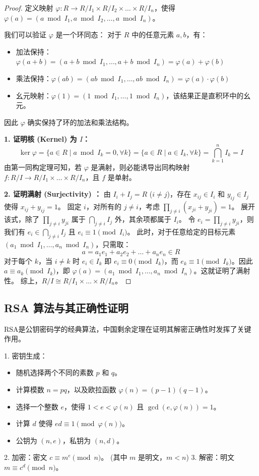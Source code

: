 \documentclass[11pt]{article}
\begin{document}
\begin{proof}
定义映射 $\varphi: R \to R/I_1 \times R/I_2 \times \dots \times R/I_n$，使得 $\varphi(a) = (a \bmod I_1, a \bmod I_2, \dots, a \bmod I_n)$。

我们可以验证 $\varphi$ 是一个环同态：
对于 $R$ 中的任意元素 $a, b$，有：
\begin{itemize}
    \item 加法保持：$\varphi(a+b) = (a+b \bmod I_1, \dots, a+b \bmod I_n) = \varphi(a) + \varphi(b)$
    \item 乘法保持：$\varphi(ab) = (ab \bmod I_1, \dots, ab \bmod I_n) = \varphi(a) \cdot \varphi(b)$
    \item 幺元映射：$\varphi(1) = (1 \bmod I_1, \dots, 1 \bmod I_n)$，该结果正是直积环中的幺元。
\end{itemize}
因此 $\varphi$ 确实保持了环的加法和乘法结构。

\textbf{1. 证明核 (Kernel) 为 $I$：}
$$ \ker \varphi = \{ a \in R \mid a \bmod I_k = 0, \forall k \} = \{ a \in R \mid a \in I_k, \forall k \} = \bigcap_{k=1}^n I_k = I $$
由第一同构定理可知，若 $\varphi$ 是满射，则必能诱导出同构映射 $f: R/I \to R/I_1 \times \dots \times R/I_n$，且 $f$ 是单射。

\textbf{2. 证明满射 (Surjectivity) ：}
由 $I_i + I_j = R$ ($i \neq j$)，存在 $x_{ij} \in I_i$ 和 $y_{ij} \in I_j$ 使得 $x_{ij} + y_{ij} = 1$。
固定 $i$，对所有的 $j \neq i$，考虑 $\prod_{j \neq i} (x_{ji} + y_{ji}) = 1$。
展开该式，除了 $\prod_{j \neq i} y_{ji}$ 属于 $\bigcap_{j \neq i} I_j$ 外，其余项都属于 $I_i$。
令 $e_i = \prod_{j \neq i} y_{ji}$，则我们有 $e_i \in \bigcap_{j \neq i} I_j$ 且 $e_i \equiv 1 \pmod{I_i}$。
此时，对于任意给定的目标元素 $(a_1 \bmod I_1, \dots, a_n \bmod I_n)$，只需取：
$$ a = a_1 e_1 + a_2 e_2 + \dots + a_n e_n \in R $$
对于每个 $k$，当 $i \neq k$ 时 $e_i \in I_k$ 即 $e_i \equiv 0 \pmod{I_k}$，而 $e_k \equiv 1 \pmod{I_k}$。因此 $a \equiv a_k \pmod{I_k}$，即 $\varphi(a) = (a_1 \bmod I_1, \dots, a_n \bmod I_n)$。这就证明了满射性。
综上，$R/I \cong R/I_1 \times \dots \times R/I_n$。
\end{proof}

\subsection{RSA 算法与其正确性证明}
RSA是公钥密码学的经典算法，中国剩余定理在证明其解密正确性时发挥了关键作用。

\begin{cnproperty}[RSA算法原理]
1. 密钥生成：
\begin{itemize}
    \item 随机选择两个不同的素数 $p$ 和 $q$。
    \item 计算模数 $n = pq$，以及欧拉函数 $\varphi(n) = (p-1)(q-1)$。
    \item 选择一个整数 $e$，使得 $1 < e < \varphi(n)$ 且 $\gcd(e, \varphi(n)) = 1$。
    \item 计算 $d$ 使得 $ed \equiv 1 \pmod{\varphi(n)}$。
    \item 公钥为 $(n, e)$，私钥为 $(n, d)$。
\end{itemize}
2. 加密：密文 $c \equiv m^e \pmod{n}$。 (其中 $m$ 是明文，$m < n$)
3. 解密：明文 $m \equiv c^d \pmod{n}$。
\end{cnproperty}
\end{document}
